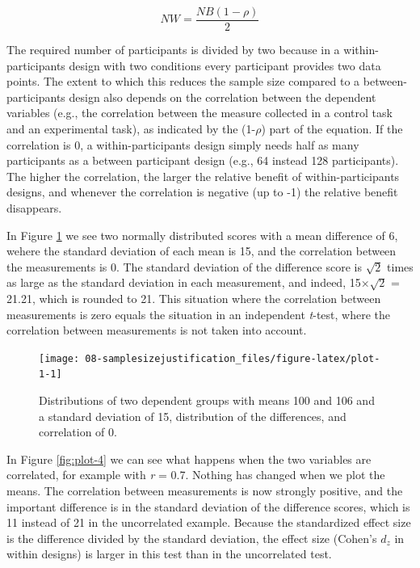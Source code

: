 \documentclass[
  oneside]{book}
\begin{document}
\[NW = \frac{NB (1-\rho)}{2}\]

The required number of participants is divided by two because in a within-participants design with two conditions every participant provides two data points. The extent to which this reduces the sample size compared to a between-participants design also depends on the correlation between the dependent variables (e.g., the correlation between the measure collected in a control task and an experimental task), as indicated by the (1-\(\rho\)) part of the equation. If the correlation is 0, a within-participants design simply needs half as many participants as a between participant design (e.g., 64 instead 128 participants). The higher the correlation, the larger the relative benefit of within-participants designs, and whenever the correlation is negative (up to -1) the relative benefit disappears.

In Figure \ref{fig:plot-1} we see two normally distributed scores with a mean difference of 6, wehere the standard deviation of each mean is 15, and the correlation between the measurements is 0. The standard deviation of the difference score is \(\sqrt{2}\) times as large as the standard deviation in each measurement, and indeed, 15×\(\sqrt{2}\) = 21.21, which is rounded to 21. This situation where the correlation between measurements is zero equals the situation in an independent \emph{t}-test, where the correlation between measurements is not taken into account.



\begin{figure}

{\centering \texttt{[image: 08-samplesizejustification\_files/figure-latex/plot-1-1]} 

}

\caption{Distributions of two dependent groups with means 100 and 106 and a standard deviation of 15, distribution of the differences, and correlation of 0.}\label{fig:plot-1}
\end{figure}

In Figure \ref{fig:plot-4} we can see what happens when the two variables are correlated, for example with \emph{r} = 0.7. Nothing has changed when we plot the means. The correlation between measurements is now strongly positive, and the important difference is in the standard deviation of the difference scores, which is 11 instead of 21 in the uncorrelated example. Because the standardized effect size is the difference divided by the standard deviation, the effect size (Cohen's \(d_z\) in within designs) is larger in this test than in the uncorrelated test.
\end{document}
